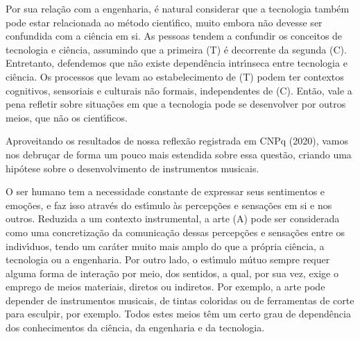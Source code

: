 \documentclass[
12pt,		%
openright,	%
twoside,  %
a4paper,			%
chapter=TITLE,		%
english,			%
french,				%
spanish,			%
brazil				%
]{USPSC-classe/USPSC}
\begin{document}
Por sua rela\c{c}\~ao com a engenharia, \'e natural considerar que a tecnologia tamb\'em pode estar relacionada ao m\'etodo cient\'{\i}fico, muito embora n\~ao devesse ser confundida com a ci\^encia em si. As pessoas tendem a confundir os conceitos de tecnologia e ci\^encia, assumindo que a primeira (T) \'e decorrente da segunda (C). Entretanto, defendemos que n\~ao existe depend\^encia intr\'{\i}nseca entre tecnologia e ci\^encia. Os processos que levam ao estabelecimento de (T) podem ter contextos cognitivos, sensoriais e culturais n\~ao formais, independentes de (C). Ent\~ao, vale a pena refletir sobre situa\c{c}\~oes em que a tecnologia pode se desenvolver por outros meios, que n\~ao os cient\'{\i}ficos.

















Aproveitando os resultados de nossa reflex\~ao registrada em  CNPq (2020), vamos nos debru\c{c}ar de forma um pouco mais estendida sobre essa quest\~ao, criando uma hip\'otese sobre o desenvolvimento de instrumentos musicais.

















O ser humano tem a necessidade constante de expressar seus sentimentos e emo\c{c}\~oes, e faz isso atrav\'es do est\'{\i}mulo \`as percep\c{c}\~oes e sensa\c{c}\~oes em si e nos outros. Reduzida a um contexto instrumental, a arte (A) pode ser considerada como uma concretiza\c{c}\~ao da comunica\c{c}\~ao dessas percep\c{c}\~oes e sensa\c{c}\~oes entre os indiv\'{\i}duos, tendo um car\'ater muito mais amplo do que a pr\'opria ci\^encia, a tecnologia ou a engenharia. Por outro lado, o est\'{\i}mulo m\'utuo sempre requer alguma forma de intera\c{c}\~ao por meio, dos sentidos, a qual, por sua vez, exige o emprego de meios materiais, diretos ou indiretos. Por exemplo, a arte pode depender de instrumentos musicais, de tintas coloridas ou de ferramentas de corte para esculpir, por exemplo. Todos estes meios t\^em um certo grau de depend\^encia dos conhecimentos da ci\^encia, da engenharia e da tecnologia.
\end{document}
